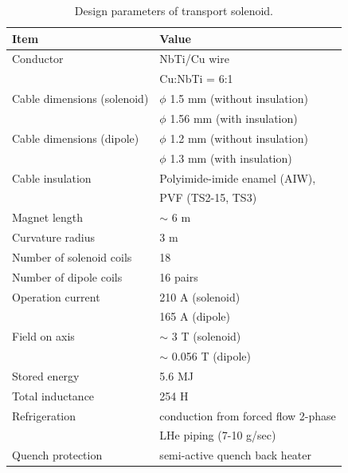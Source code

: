 \begin{table}[H]
 \centering
 \begin{tabular}{ll} \hline \hline
  Item & Value \\ \hline
  Conductor & NbTi/Cu wire \\
   & Cu:NbTi = 6:1 \\
  Cable dimensions (solenoid) & $\phi$ 1.5 mm (without insulation) \\
   & $\phi$ 1.56 mm (with insulation) \\
  Cable dimensions (dipole) & $\phi$ 1.2 mm (without insulation) \\
   & $\phi$ 1.3 mm (with insulation) \\
  Cable insulation & Polyimide-imide enamel (AIW), \\
   & PVF (TS2-15, TS3) \\
  Magnet length & $\sim$ 6 m \\
  Curvature radius & 3 m \\
  Number of solenoid coils & 18 \\
  Number of dipole coils & 16 pairs \\
  Operation current & 210 A (solenoid) \\
   & 165 A (dipole) \\
  Field on axis & $\sim$ 3 T (solenoid) \\
   & $\sim$ 0.056 T (dipole) \\
  Stored energy & 5.6 MJ \\
  Total inductance & 254 H \\
  Refrigeration & conduction from forced flow 2-phase \\
   & LHe piping (7-10 g/sec) \\
  Quench protection & semi-active quench back heater \\ \hline \hline
 \end{tabular}
 \caption{Design parameters of transport solenoid.}
 \label{designts}
\end{table}


